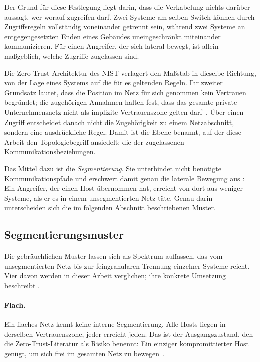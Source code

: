 Der Grund für diese Festlegung liegt darin, dass die Verkabelung nichts darüber
aussagt, wer worauf zugreifen darf. Zwei Systeme am selben Switch können durch
Zugriffsregeln vollständig voneinander getrennt sein, während zwei Systeme an
entgegengesetzten Enden eines Gebäudes uneingeschränkt miteinander
kommunizieren. Für einen Angreifer, der sich lateral bewegt, ist allein
maßgeblich, welche Zugriffe zugelassen sind.

Die Zero-Trust-Architektur des \ac{NIST} verlagert den Maßstab in dieselbe
Richtung, von der Lage eines Systems auf die für es geltenden Regeln.
Ihr zweiter Grundsatz lautet, dass die Position im Netz für sich genommen kein
Vertrauen begründet; die zugehörigen Annahmen halten fest, dass das gesamte
private Unternehmensnetz nicht als implizite Vertrauenszone gelten
darf~\cite[Abschn.~2.1--2.2]{nist800207}. Über einen Zugriff entscheidet danach
nicht die Zugehörigkeit zu einem Netzabschnitt, sondern eine ausdrückliche
Regel. Damit ist die Ebene benannt, auf der diese Arbeit den Topologiebegriff
ansiedelt: die der zugelassenen Kommunikationsbeziehungen.

Das Mittel dazu ist die \emph{Segmentierung}. Sie unterbindet nicht benötigte
Kommunikationspfade und erschwert damit genau die laterale Bewegung aus
: Ein Angreifer, der einen Host übernommen hat,
erreicht von dort aus weniger Systeme, als er es in einem unsegmentierten Netz
täte. Genau darin unterscheiden sich die im folgenden Abschnitt beschriebenen
Muster.

\subsection{Segmentierungsmuster}
\label{sec:segmentierungsmuster}

Die gebräuchlichen Muster lassen sich als Spektrum auffassen, das vom
unsegmentierten Netz bis zur feingranularen Trennung einzelner Systeme reicht.
Vier davon werden in dieser Arbeit verglichen; ihre konkrete Umsetzung
beschreibt .

\paragraph{Flach.}
Ein flaches Netz kennt keine interne Segmentierung. Alle Hosts liegen in
derselben Vertrauenszone, jeder erreicht jeden. Das ist der Ausgangszustand, den
die Zero-Trust-Literatur als Risiko benennt: Ein einziger kompromittierter Host
genügt, um sich frei im gesamten Netz zu bewegen~\cite{nist800207}.

